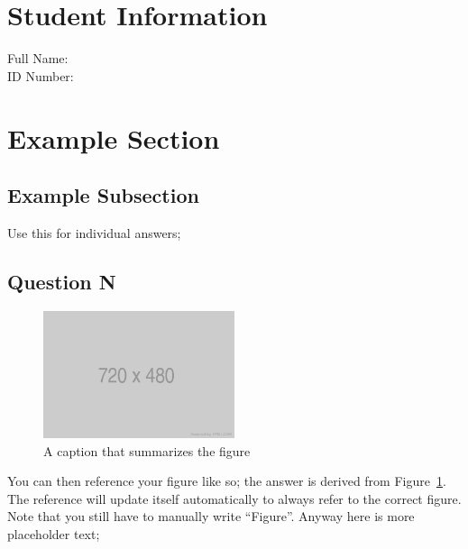 \documentclass[12pt,a4paper]{article}
\begin{document}
\section*{Student Information}
Full Name: \\
ID Number:


\section{Example Section}%
\label{sec:example_section}

\kant[42]


\subsection{Example Subsection}%
\label{sub:example_subsection}

Use this for individual answers;

\subsection{Question N}%
\label{sub:question_n}

\kant[29-30]

\begin{figure}[htbp] %
    \centerline{\includegraphics[width=0.5\textwidth]{720x480.png}}
    \caption{A caption that summarizes the figure}%
    \label{fig:example_figure} %
\end{figure}

You can then reference your figure like so; the answer is derived from Figure~\ref{fig:example_figure}. The reference will update itself automatically to always refer to the correct figure. Note that you still have to manually write \enquote{Figure}. Anyway here is more placeholder text;

\kant[7]


\end{document}
